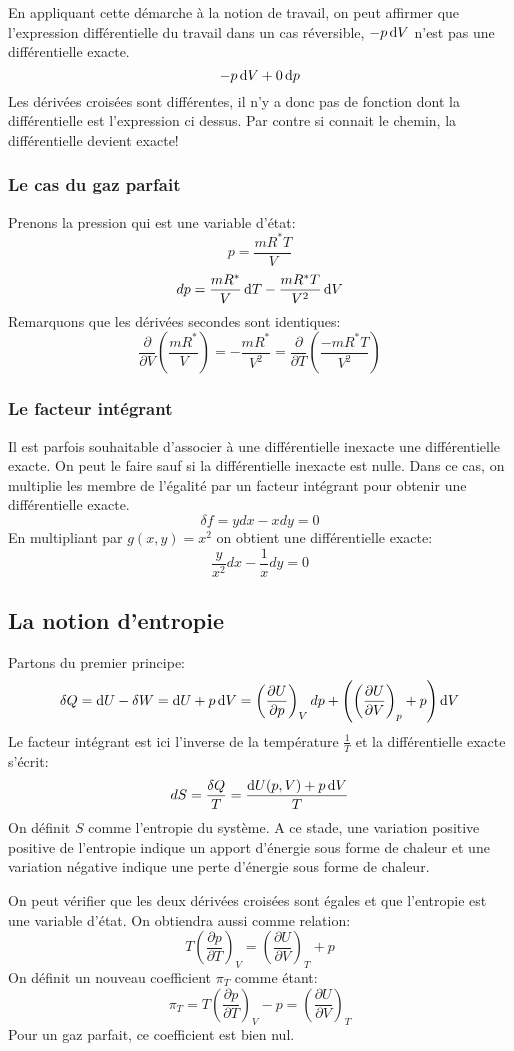 En appliquant cette démarche à la notion de travail,
on peut affirmer que l'expression différentielle du travail
dans un cas réversible, $-p\operatorname{d}\! V$ n'est pas une différentielle exacte.
\[ -p\operatorname{d}\! V+0\operatorname{d}\! p \]
Les dérivées croisées sont différentes,
il n'y a donc pas de fonction dont la différentielle est l'expression ci dessus.
Par contre si connait le chemin, la différentielle devient exacte!
\subsubsection{Le cas du gaz parfait}
Prenons la pression qui est une variable d'état:
\[ p = \frac{mR^*T}{V} \]
\[ dp = \frac{mR^*}{V}\operatorname{d}\! T-\frac{mR^*T}{V^2}\operatorname{d}\! V \]
Remarquons que les dérivées secondes sont identiques:
\[ \frac{\partial}{\partial V} \left(\frac{mR^*}{V}\right) =
-\frac{mR^*}{V^2} = \frac{\partial}{\partial T}
\left(\frac{-mR^*T}{V^2}\right) \]

\subsubsection{Le facteur intégrant}
Il est parfois souhaitable d'associer à une différentielle
inexacte une différentielle exacte.
On peut le faire sauf si la différentielle inexacte est nulle.
Dans ce cas, on multiplie les membre de l'égalité par un facteur intégrant
pour obtenir une différentielle exacte.
\[ \delta f = ydx-xdy = 0 \]
En multipliant par $g(x,y) = x^2$ on obtient une différentielle exacte:
\[ \frac y {x^2} dx -\frac 1xdy = 0 \]
\subsection{La notion d'entropie}
Partons du premier principe:
\[ \delta Q = \operatorname{d}\! U - \delta W = \operatorname{d}\! U +p\operatorname{d}\! V =
\left(\frac{\partial U}{\partial p}\right)_V dp +
\left ( \left ( \frac{\partial U}{\partial V}\right)_p + p \right)\operatorname{d}\! V \]
Le facteur intégrant est ici l'inverse de la température
$\frac{1}{T}$ et la différentielle exacte s'écrit:
\[ dS = \frac{\delta Q}{T} = \frac{\operatorname{d}\! U(p,V)+p\operatorname{d}\! V }T \]
On définit $S$ comme l'entropie du système.
A ce stade, une variation positive positive de l'entropie
indique un apport d'énergie sous forme de chaleur et
une variation négative indique une perte d'énergie sous forme de chaleur.

On peut vérifier que les deux dérivées croisées sont égales et
que l'entropie est une variable d'état.
On obtiendra aussi comme relation:
\[ T\left(\frac{\partial p}{\partial T}\right)_V =
\left(\frac{\partial U}{\partial V}\right)_T+p \]
On définit un nouveau coefficient $\pi_T$ comme étant:
\[ \pi_T = T\left(\frac{\partial p}{\partial T}\right)_V -p =
\left(\frac{\partial U}{\partial V}\right)_T \]
Pour un gaz parfait, ce coefficient est bien nul.


